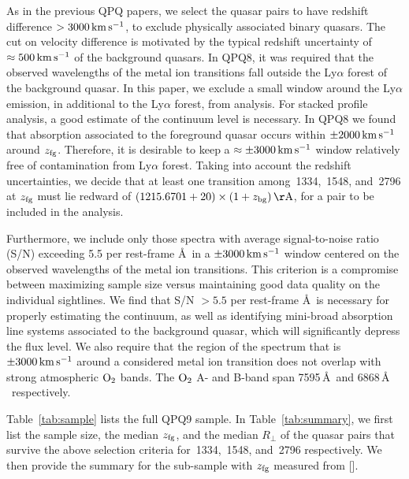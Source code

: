\documentclass[iop]{emulateapj}
\begin{document}
As in the previous QPQ papers, we select the quasar pairs to have redshift difference 
$>3000\,{\rm km\,s^{-1}}$, to exclude physically associated binary quasars. The cut on velocity 
difference is motivated by the typical redshift uncertainty of $\approx500\,{\rm km\,s^{-1}}$ of 
the background quasars. In QPQ8, it was required that the observed wavelengths of the 
metal ion transitions fall outside the Ly$\alpha$ forest of the background quasar. In this paper, 
we exclude a small window around the Ly$\alpha$ emission, in additional to the Ly$\alpha$ forest, 
from analysis. For stacked profile analysis, a good estimate of 
the continuum level is necessary. In QPQ8 we found that absorption associated to 
the foreground quasar occurs within $\pm2000\,{\rm km\,s^{-1}}$ around $z_{\rm fg}$. Therefore, it 
is desirable to keep a $\approx\pm3000\,{\rm km\,s^{-1}}$ window relatively free of contamination 
from Ly$\alpha$ forest. Taking into account the redshift uncertainties, 
we decide that at least one transition among \,1334, \,1548, and 
\,2796 at $z_{\rm fg}$ must lie redward of 
$(1215.6701+20)\times(1+z_{\rm bg})\,{\rm \AA}$, for a pair to be included in the analysis. 

Furthermore, we include only those spectra with average signal-to-noise ratio (S/N) exceeding 5.5 
per rest-frame \AA \ in a $\pm3000\,{\rm km\,s^{-1}}$ window centered on the observed wavelengths 
of the metal ion transitions. This criterion is a compromise between maximizing sample size versus 
maintaining good data quality on the individual sightlines. We find that S/N $>5.5$ per rest-frame 
\AA \ is necessary for properly estimating the continuum, as well as identifying mini-broad 
absorption line systems associated to the background quasar, which will significantly depress the 
flux level. We also require that the region of the spectrum that is $\pm3000\,{\rm km\,s^{-1}}$ 
around a considered metal ion transition does not overlap with strong atmospheric ${\rm O}_2$ 
bands. The ${\rm O}_2$ A- and B-band span 7595\,\AA \ and 6868\,\AA 
\ respectively. 

Table~\ref{tab:sample} lists the full QPQ9 sample. In Table~\ref{tab:summary}, we first list the 
sample size, the median $z_{\rm fg}$, and the median $R_\perp$ of the quasar pairs that survive 
the above selection criteria for \,1334, \,1548, and \,2796 
respectively. We then provide the summary for the sub-sample with $z_{\rm fg}$ measured from 
[]. 
\end{document}

